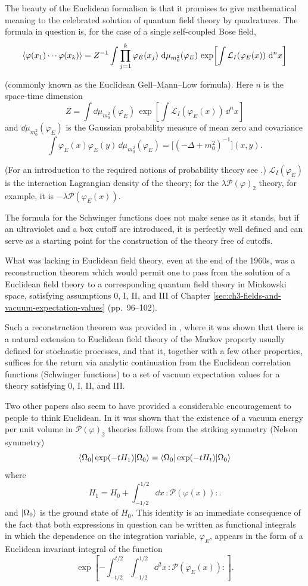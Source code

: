 The beauty of the Euclidean formalism is that it promises to give
mathematical meaning to the celebrated solution of quantum field theory by
quadratures. The formula in question is, for the case of a single self-coupled
Bose field,
\[
  \langle \varphi(x_1)\cdots\varphi(x_k)\rangle
  =Z^{-1}\int\prod_{j=1}^{k}\varphi_E(x_j)\,
    \mathop{}\!\mathrm{d}\mu_{m_0^2}(\varphi_E)\,
    \exp\!\left[\int\mathcal{L}_I(\varphi_E(x))\,\mathop{}\!\mathrm{d}^n x\right]
\]

(commonly known as the Euclidean Gell--Mann--Low formula). Here $n$ is the
space-time dimension
\[
  Z=\int\dd\mu_{m_0^2}(\varphi_E)\,
    \exp\!\left[\int\mathcal{L}_I(\varphi_E(x))\,\dd^n x\right]
\]
and $\dd\mu_{m_0^2}(\varphi_E)$ is the Gaussian probability measure of mean
zero and covariance
\[
  \int\varphi_E(x)\varphi_E(y)\,\dd\mu_{m_0^2}(\varphi_E)
  =\bigl[(-\Delta+m_0^2)^{-1}\bigr](x,y).
\]

(For an introduction to the required notions of probability theory see \cite{pct-app-33}.)
$\mathcal{L}_I(\varphi_E)$ is the interaction Lagrangian density of the
theory; for the $\lambda\mathcal{P}(\varphi)_2$ theory, for example, it is
$-\lambda\mathcal{P}(\varphi_E(x))$.

The formula for the Schwinger functions does not make sense as it stands, but
if an ultraviolet and a box cutoff are introduced, it is perfectly well
defined and can serve as a starting point for the construction of the theory
free of cutoffs.

What was lacking in Euclidean field theory, even at the end of the 1960s, was a
reconstruction theorem which would permit one to pass from the solution of a
Euclidean field theory to a corresponding quantum field theory in Minkowski
space, satisfying assumptions 0, I, II, and III of Chapter \ref{sec:ch3-fields-and-vacuum-expectation-values} (pp.~96--102).

Such a reconstruction theorem was provided in \cite{pct-app-34}, where it was shown that
there is a natural extension to Euclidean field theory of the Markov property
usually defined for stochastic processes, and that it, together with a few
other properties, suffices for the return via analytic continuation from the
Euclidean correlation functions (Schwinger functions) to a set of vacuum
expectation values for a theory satisfying 0, I, II, and III.

Two other papers also seem to have provided a considerable encouragement to
people to think Euclidean. In \cite{pct-app-35} it was shown that
the existence of a vacuum energy per unit volume in $\mathcal{P}(\varphi)_2$
theories follows from the striking symmetry (Nelson symmetry)
\[
  \langle \Omega_0\vert \exp(-tH_1)\vert \Omega_0\rangle
  =\langle \Omega_0\vert \exp(-tH_t)\vert \Omega_0\rangle
\]
where
\[
  H_1=H_0+\int_{-1/2}^{1/2}\dd x\,:\mathcal{P}(\varphi(x)):.
\]
and $\lvert \Omega_0\rangle$ is the ground state of $H_0$. This identity is an
immediate consequence of the fact that both expressions in question can be
written as functional integrals in which the dependence on the integration
variable, $\varphi_E$, appears in the form of a Euclidean invariant integral
of the function
\[
  \exp\!\left[-\int_{-t/2}^{t/2}\int_{-1/2}^{1/2}
    \dd^2x\,:\mathcal{P}(\varphi_E(x)):\right].
\]

